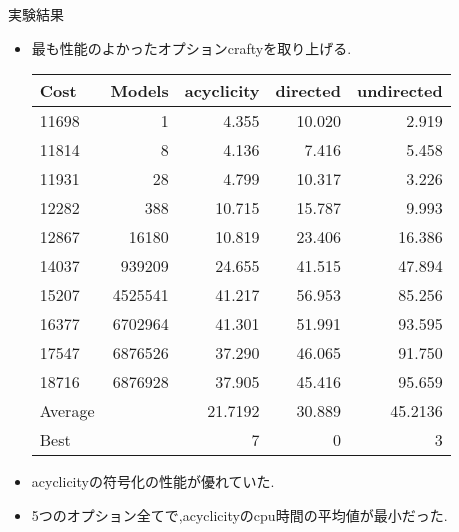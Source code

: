 \documentclass[dvipdfmx,11pt]{beamer}
\begin{document}
\begin{frame}{実験結果}
  \begin{itemize}
  \item 最も性能のよかったオプションcraftyを取り上げる.
\begin{table}
  \begin{tabular}{l|rrrr}
    \hline
    Cost    &	Models & acyclicity & directed & undirected\\
    \hline
    11698   &	1      & 4.355	&10.020	&\alert{2.919}\\
    11814   &	8      & \alert{4.136}	&7.416	&5.458\\
    11931   &	28     & 4.799	&10.317	&\alert{3.226}\\
    12282   &	388    & 10.715	&15.787	&\alert{9.993}\\
    12867   &	16180  & \alert{10.819}	&23.406	&16.386\\
    14037   &	939209 & \alert{24.655}	&41.515	&47.894\\
    15207   &	4525541& \alert{41.217}	&56.953	&85.256\\
    16377   &	6702964& \alert{41.301}	&51.991	&93.595\\
    17547   &	6876526& \alert{37.290}	&46.065	&91.750\\
    18716   &	6876928& \alert{37.905}	&45.416	&95.659\\
    \hline
    Average &  & \alert{21.7192} & 30.889 & 45.2136\\
    Best    &   & \alert{7} & 0 & 3\\
    \hline
  \end{tabular}
\end{table}
  \item acyclicityの符号化の性能が優れていた.
  \item 5つのオプション全てで,acyclicityのcpu時間の平均値が最小だった.
  \end{itemize}
\end{frame}
\end{document}
